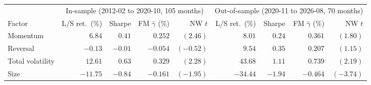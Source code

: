 \begin{tabular}{lrrrrrrrr}
\toprule
& \multicolumn{4}{c}{In-sample (2012-02 to 2020-10, 105 months)} & \multicolumn{4}{c}{Out-of-sample (2020-11 to 2026-08, 70 months)} \\
\cmidrule(lr){2-5} \cmidrule(lr){6-9}
Factor & L/S ret.\ (\%) & Sharpe & FM $\bar\gamma$ (\%) & NW $t$ & L/S ret.\ (\%) & Sharpe & FM $\bar\gamma$ (\%) & NW $t$ \\
\midrule
Momentum & $6.84$ & $0.41$ & $0.252$ & $(2.46)$ & $8.01$ & $0.24$ & $0.361$ & $(1.80)$ \\
Reversal & $-0.13$ & $-0.01$ & $-0.054$ & $(-0.52)$ & $9.54$ & $0.35$ & $0.207$ & $(1.15)$ \\
Total volatility & $12.61$ & $0.63$ & $0.329$ & $(2.28)$ & $43.68$ & $1.11$ & $0.739$ & $(2.19)$ \\
Size & $-11.75$ & $-0.84$ & $-0.161$ & $(-1.95)$ & $-34.44$ & $-1.94$ & $-0.464$ & $(-3.74)$ \\
\bottomrule
\end{tabular}
